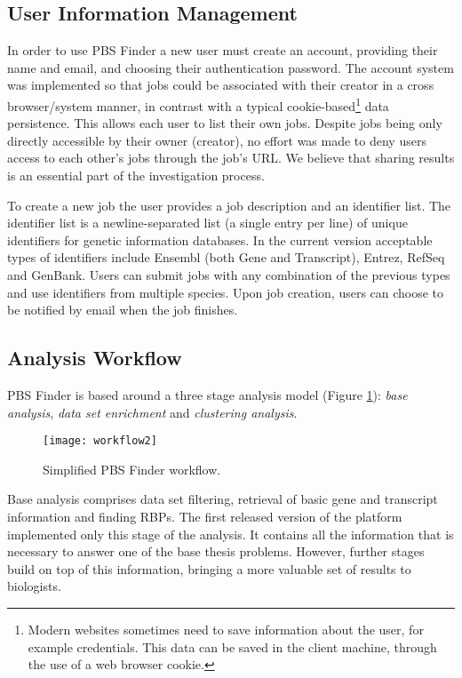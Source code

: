 \subsection{User Information Management}

In order to use PBS Finder a new user must create an account, providing their
name and email, and choosing their authentication password. The account system
was implemented so that jobs could be associated with their creator in a cross
browser/system manner, in contrast with a typical cookie-based\footnote{Modern
websites sometimes need to save information about the user, for example
credentials. This data can be saved in the client machine, through the use of a
web browser cookie.} data persistence. This allows each user to list their own
jobs. Despite jobs being only directly accessible by their owner (creator), no
effort was made to deny users access to each other's jobs through the job's URL.
We believe that sharing results is an essential part of the investigation
process.

To create a new job the user provides a job description and an identifier list.
The identifier list is a newline-separated list (a single entry per line) of
unique identifiers for genetic information databases. In the current version
acceptable types of identifiers include Ensembl (both Gene and Transcript),
Entrez, RefSeq and GenBank. Users can submit jobs with any combination of the
previous types and use identifiers from multiple species. Upon job creation,
users can choose to be notified by email when the job finishes.

\subsection{Analysis Workflow}\label{sec:pbsworkflow}

PBS Finder is based around a three stage analysis model (Figure
\ref{fig:workflow2}): \emph{base analysis}, \emph{data set enrichment} and
\emph{clustering analysis}.

\begin{figure}[!htb]
  \begin{center}
    \leavevmode
    \texttt{[image: workflow2]}
    \caption[Simplified PBS Finder workflow]{
      Simplified PBS Finder workflow.
    }
    \label{fig:workflow2}
  \end{center}
\end{figure}

Base analysis comprises data set filtering, retrieval of basic gene and
transcript information and finding RBPs. The first released version of the
platform implemented only this stage of the analysis. It contains all the
information that is necessary to answer one of the base thesis problems.
However, further stages build on top of this information, bringing a more
valuable set of results to biologists.

